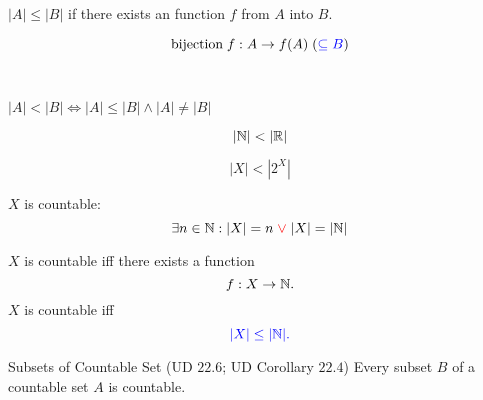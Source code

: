 \begin{frame}{}
\end{frame}

\begin{frame}{}
  \begin{definition}[$|A| \le |B|$]
    $|A| \le |B|$ if there exists an  function $f$ from $A$ into $B$.
  \end{definition}

  \pause
  \[
    \text{bijection} \;f: A \to f(A) \; (\textcolor{blue}{\subseteq B})
  \]

  \pause
  \vspace{0.80cm}
  \begin{center}
    {} \\[8pt] \pause
    {}
  \end{center}
\end{frame}

\begin{frame}{}
  \begin{definition}[$|A| < |B|$]
    $|A| < |B| \iff |A| \le |B| \land |A| \neq |B|$ 
  \end{definition}

  \pause
  \[
    |\mathbb{N}| < |\mathbb{R}|
  \]

  \[
    |X| < |2^{X}|
  \]
\end{frame}

\begin{frame}{}
  \begin{definition}
    $X$ is countable:
    \[
      \exists n \in \mathbb{N}: |X| = n \textcolor{red}{\;\lor\;} |X| = |\mathbb{N}|
    \]
  \end{definition}

  \pause
  \begin{theorem}
    $X$ is countable iff there exists a  function
    \[
      f: X \to \mathbb{N}.
    \]
    \pause
    $X$ is countable iff
    \[
      \textcolor{blue}{|X| \le |\mathbb{N}|.}
    \]
  \end{theorem}

  \pause
  \begin{exampleblock}{Subsets of Countable Set (UD $22.6$; UD Corollary $22.4$)}
    Every subset $B$ of a countable set $A$ is countable.
  \end{exampleblock}
\end{frame}

